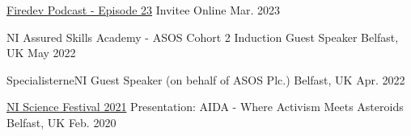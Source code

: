 
\begin{cvminortalks}


   \cvminortalk
    {\href{https://podcasters.spotify.com/pod/show/firedev/episodes/FireDEV-23---Dominik-Kiersz-Programmer-For-One-Of-the-UKs-Largest-Online-Retailers-ASOS-e1tvvvr}{Firedev Podcast - Episode 23}}
    {Invitee}
    {Online} %
    {Mar. 2023} %
    
    \cvminortalk
   	{NI Assured Skills Academy - ASOS Cohort 2 Induction}
    {Guest Speaker}
    {Belfast, UK} %
    {May 2022} %
    
    \cvminortalk
   	{SpecialisterneNI}
    {Guest Speaker (on behalf of ASOS Plc.)}
    {Belfast, UK} %
    {Apr. 2022} %
   
    \cvminortalk
   	{\href{https://kiersz.dev/src/resources/aida-presentation.pdf}{NI Science Festival 2021}}
    {Presentation: AIDA - Where Activism Meets Asteroids}
    {Belfast, UK} %
    {Feb. 2020} %
   

\end{cvminortalks}